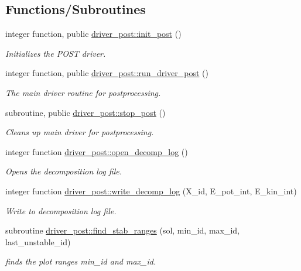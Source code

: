 \subsection*{Functions/\+Subroutines}
\begin{DoxyCompactItemize}
\item 
integer function, public \hyperlink{namespacedriver__post_af527706d4e696d4e507443d2f74194ef}{driver\+\_\+post\+::init\+\_\+post} ()
\begin{DoxyCompactList}\small\item\em Initializes the P\+O\+ST driver. \end{DoxyCompactList}\item 
integer function, public \hyperlink{namespacedriver__post_a33b3c6f9018a0ddc92dce77394b8ab37}{driver\+\_\+post\+::run\+\_\+driver\+\_\+post} ()
\begin{DoxyCompactList}\small\item\em The main driver routine for postprocessing. \end{DoxyCompactList}\item 
subroutine, public \hyperlink{namespacedriver__post_a71f9fb1935222111e1c7cfc15c5d0269}{driver\+\_\+post\+::stop\+\_\+post} ()
\begin{DoxyCompactList}\small\item\em Cleans up main driver for postprocessing. \end{DoxyCompactList}\item 
integer function \hyperlink{namespacedriver__post_a5d76f87f131e21b4d74fd5f4a7bbbd6b}{driver\+\_\+post\+::open\+\_\+decomp\+\_\+log} ()
\begin{DoxyCompactList}\small\item\em Opens the decomposition log file. \end{DoxyCompactList}\item 
integer function \hyperlink{namespacedriver__post_a4981c6c0e63b862c92ba240f43e22e77}{driver\+\_\+post\+::write\+\_\+decomp\+\_\+log} (X\+\_\+id, E\+\_\+pot\+\_\+int, E\+\_\+kin\+\_\+int)
\begin{DoxyCompactList}\small\item\em Write to decomposition log file. \end{DoxyCompactList}\item 
subroutine \hyperlink{namespacedriver__post_a51ecad1032e415d2a8e6e5b97d2c7e09}{driver\+\_\+post\+::find\+\_\+stab\+\_\+ranges} (sol, min\+\_\+id, max\+\_\+id, last\+\_\+unstable\+\_\+id)
\begin{DoxyCompactList}\small\item\em finds the plot ranges {\ttfamily min\+\_\+id} and {\ttfamily max\+\_\+id}. \end{DoxyCompactList}\item 

\end{DoxyCompactItemize}
